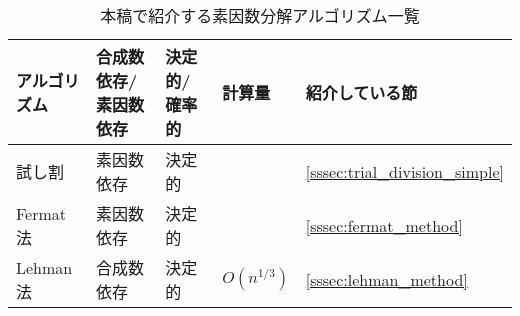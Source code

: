 \begin{table}[htb]
\centering
\caption{本稿で紹介する素因数分解アルゴリズム一覧}
\label{tb:integer_factorization_list}
\begin{tabular}{|l|l|l|l|l|}
\hline
アルゴリズム                         & 合成数依存/素因数依存 & 決定的/確率的 & 計算量                & 紹介している節 \\ \hline\hline
試し割                               & 素因数依存            & 決定的        &                       & \ref{sssec:trial_division_simple} \\ \hline
Fermat法                             & 素因数依存            & 決定的        &                       & \ref{sssec:fermat_method}         \\ \hline
Lehman法\cite{Lehman1974FactoringLI} & 合成数依存            & 決定的        & $O(n^{1/3})$          & \ref{sssec:lehman_method}         \\ \hline
\end{tabular}
\end{table}
